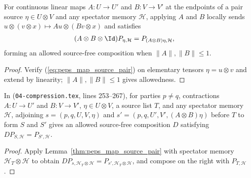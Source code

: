 \begin{lemma}
    \label{thm:peps_map_source_pair}
    \leanok
    For continuous linear maps $A:U\to U'$ and $B:V\to V'$ at the endpoints of
    a pair source $\eta\in U\otimes V$ and any spectator memory $\mathcal H$,
    applying $A$ and $B$ locally sends $u\otimes(v\otimes x)\mapsto Au\otimes(Bv\otimes x)$
    and satisfies
    \begin{align}
        (A\otimes B\otimes\Id)P_{\eta,\mathcal H}
         & =P_{(A\otimes B)\eta,\mathcal H},
        \label{eq:peps_map_source_pair}
    \end{align}
    forming an allowed source-free composition when $\|A\|,\|B\|\le 1$.
\end{lemma}

\begin{proof}\leanok
    Verify (\ref{eq:peps_map_source_pair}) on elementary tensors
    $\eta=u\otimes v$ and extend by linearity; $\|A\|,\|B\|\le 1$ gives
    allowedness.
\end{proof}

\begin{lemma}
    \label{thm:peps_source_cons_mapL}
    \leanok
    In \cite[proof of Theorem~5.2]{OpenAI2026PolynomialPEPS}
    (\texttt{04-compression.tex}, lines 253--267), for parties $p\ne q$,
    contractions $A:U\to U'$ and $B:V\to V'$, $\eta\in U\otimes V$, a source
    list $T$, and any spectator memory $\mathcal H$, adjoining $s=(p,q,U,V,\eta)$
    and $s'=(p,q,U',V',(A\otimes B)\eta)$ before $T$ to form $S$ and $S'$ gives
    an allowed source-free composition $D$ satisfying
    $D P_{S,\mathcal H}=P_{S',\mathcal H}$.
\end{lemma}

\begin{proof}
    \leanok
    Apply Lemma~\ref{thm:peps_map_source_pair} with spectator memory
    $\mathcal H_T\otimes\mathcal H$ to obtain
    $D P_{s,\mathcal H_T\otimes\mathcal H}=P_{s',\mathcal H_T\otimes\mathcal H}$,
    and compose on the right with $P_{T,\mathcal H}$.
\end{proof}

